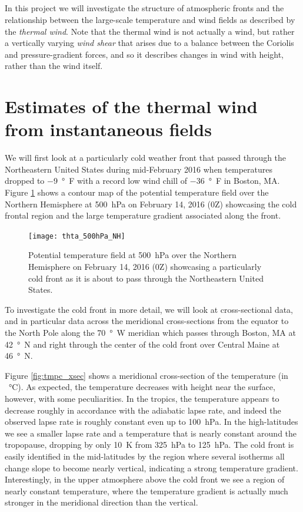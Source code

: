 \documentclass[11pt]{article}
\title{\spacedlowsmallcaps{\small 12.818: Introduction to Atmospheric Data and Large-scale Dynamics}\\ \spacedlowsmallcaps{\Large Project six: Weather fronts and the thermal wind}}
\author{\spacedlowsmallcaps{Ali Ramadhan}}
\date{}
\begin{document}
\maketitle

In this project we will investigate the structure of atmospheric fronts and the relationship between the large-scale temperature and wind fields as described by the \emph{thermal wind}. Note that the thermal wind is not actually a wind, but rather a vertically varying \emph{wind shear} that arises due to a balance between the Coriolis and pressure-gradient forces, and so it describes changes in wind with height, rather than the wind itself.

\section{Estimates of the thermal wind from instantaneous fields}

We will first look at a particularly cold weather front that passed through the Northeastern United States during mid-February 2016 when temperatures dropped to \SI{-9}{\degree F} with a record low wind chill of \SI{-36}{\degree F} in Boston, MA. Figure \ref{fig:thta_500hPa_NH} shows a contour map of the potential temperature field over the Northern Hemisphere at \SI{500}{\hecto\Pa} on February 14, 2016 (0Z) showcasing the cold frontal region and the large temperature gradient associated along the front.

\begin{figure}[h!]
	\centering
	\texttt{[image: thta\_500hPa\_NH]}
	\caption{Potential temperature field at \SI{500}{\hecto\Pa} over the Northern Hemisphere on February 14, 2016 (0Z) showcasing a particularly cold front as it is about to pass through the Northeastern United States.}
	\label{fig:thta_500hPa_NH}
\end{figure}

To investigate the cold front in more detail, we will look at cross-sectional data, and in particular data across the meridional cross-sections from the equator to the North Pole along the \SI{70}{\degree W} meridian which passes through Boston, MA at \SI{42}{\degree N} and right through the center of the cold front over Central Maine at \SI{46}{\degree N}.

Figure \ref{fig:tmpc_xsec} shows a meridional cross-section of the temperature (in \SI{}{\degreeCelsius}). As expected, the temperature decreases with height near the surface, however, with some peculiarities. In the tropics, the temperature appears to decrease roughly in accordance with the adiabatic lapse rate, and indeed the observed lapse rate is roughly constant even up to \SI{100}{\hecto\Pa}. In the high-latitudes we see a smaller lapse rate and a temperature that is nearly constant around the tropopause, dropping by only \SI{10}{\K} from \SI{325}{\hecto\Pa} to \SI{125}{\hecto\Pa}. The cold front is easily identified in the mid-latitudes by the region where several isotherms all change slope to become nearly vertical, indicating a strong temperature gradient. Interestingly, in the upper atmosphere above the cold front we see a region of nearly constant temperature, where the temperature gradient is actually much stronger in the meridional direction than the vertical.
\end{document}
